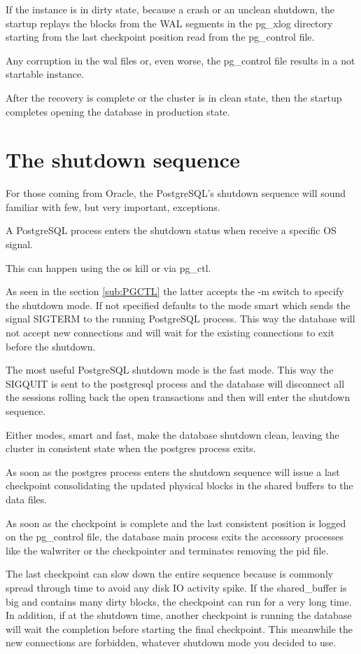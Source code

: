 If  the instance is in dirty state, because a crash or an unclean shutdown, the
startup replays the blocks from the WAL segments in the pg\_xlog directory
starting from the last checkpoint position read from the pg\_control file.

Any corruption in the wal files or, even worse, the pg\_control file results in
a not startable instance.

After the recovery is complete or the cluster is in clean state, then  the
startup completes opening the database in production state. 


\section{The shutdown sequence} 
\label{sec:SHUTDOWN_SEQ}
For those coming from Oracle, the PostgreSQL's shutdown sequence will sound 
familiar with few, but very important, exceptions.

A PostgreSQL process enters the shutdown status when receive a specific OS 
signal. 

This can happen using the os kill or via pg\_ctl. 

As seen in the section \ref{sub:PGCTL} the latter accepts the -m switch to 
specify the shutdown mode. If not specified defaults to the mode smart which 
sends the signal SIGTERM to the running PostgreSQL process. This way the 
database will not accept new connections and will wait for the existing 
connections to exit before the shutdown. 

The most useful PostgreSQL shutdown mode is the fast mode. This way the SIGQUIT 
is sent to the postgresql process and the database will disconnect all the 
sessions rolling back the open transactions and then will enter the shutdown 
sequence. 

Either modes, smart and fast, make the database shutdown clean, leaving the 
cluster in consistent state when the postgres process exits. 

As soon as the postgres process enters the shutdown sequence will issue a last 
checkpoint consolidating the updated physical blocks in the shared buffers to 
the data files.

As soon as the checkpoint is complete and the last consistent position is 
logged on the pg\_control file, the database main process exits the accessory 
processes like the walwriter or the checkpointer and terminates removing the 
pid file.

The last checkpoint can slow down the entire sequence because is commonly 
spread through time to avoid any disk IO activity spike. If the shared\_buffer 
is big and contains many dirty blocks, the checkpoint can run for a very long 
time. In addition, if at the shutdown time, another checkpoint is running the 
database will wait the completion before starting the final checkpoint. This 
meanwhile the new connections are forbidden, whatever shutdown mode you decided 
to use. 

